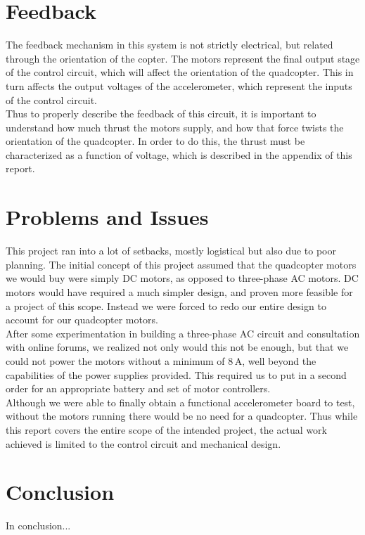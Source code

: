 \documentclass[11pt]{article} %
\begin{document}
\section{Feedback}
The feedback mechanism in this system is not strictly electrical, but related through the orientation of the copter. The motors represent the final output stage of the control circuit, which will affect the orientation of the quadcopter. This in turn affects the output voltages of the accelerometer, which represent the inputs of the control circuit.\\
Thus to properly describe the feedback of this circuit, it is important to understand how much thrust the motors supply, and how that force twists the orientation of the quadcopter. In order to do this, the thrust must be characterized as a function of voltage, which is described in the appendix of this report.

\section{Problems and Issues}
This project ran into a lot of setbacks, mostly logistical but also due to poor planning. The initial concept of this project assumed that the quadcopter motors we would buy were simply DC motors, as opposed to three-phase AC motors. DC motors would have required a much simpler design, and proven more feasible for a project of this scope. Instead we were forced to redo our entire design to account for our quadcopter motors.\\
After some experimentation in building a three-phase AC circuit and consultation with online forums, we realized not only would this not be enough, but that we could not power the motors without a minimum of 8\,A, well beyond the capabilities of the power supplies provided. This required us to put in a second order for an appropriate battery and set of motor controllers.\\
Although we were able to finally obtain a functional accelerometer board to test, without the motors running there would be no need for a quadcopter. Thus while this report covers the entire scope of the intended project, the actual work achieved is limited to the control circuit and mechanical design.
\section{Conclusion}
In conclusion...
\newpage
\appendix
\end{document}
